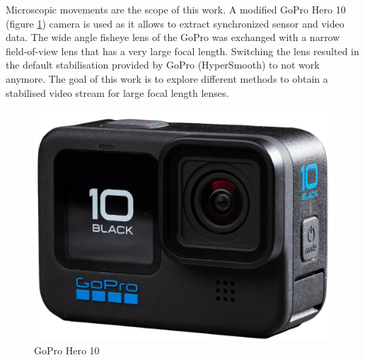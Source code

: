 Microscopic movements are the scope of this work. A modified GoPro Hero 10 (figure \ref{fig:gopro_hero10}) camera is used as it allows to extract synchronized sensor and video data. The wide angle fisheye lens of the GoPro was exchanged with a narrow field-of-view lens that has a very large focal length. Switching the lens resulted in the default stabilisation provided by GoPro (HyperSmooth) to not work anymore. The goal of this work is to explore different methods to obtain a stabilised video stream for large focal length lenses.

\begin{figure}[H]
    \centering
    \includegraphics[scale=0.1]{images/fig_chapter1/gopro_hero10.png}
    \caption{GoPro Hero 10}
    \label{fig:gopro_hero10}
\end{figure}






